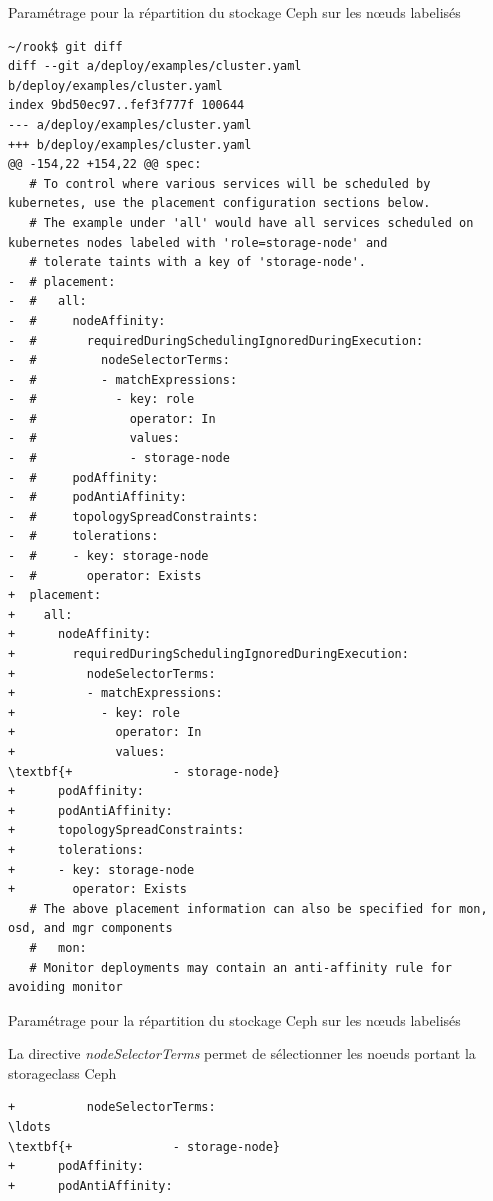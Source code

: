 \begin{frame}[shrink=5,fragile]{Paramétrage pour la répartition du stockage Ceph sur les n\oe{}uds labelisés}

\begin{tiny}
\begin{Verbatim}[commandchars=\\\{\}]
~/rook$ git diff
diff --git a/deploy/examples/cluster.yaml b/deploy/examples/cluster.yaml
index 9bd50ec97..fef3f777f 100644
--- a/deploy/examples/cluster.yaml
+++ b/deploy/examples/cluster.yaml
@@ -154,22 +154,22 @@ spec:
   # To control where various services will be scheduled by kubernetes, use the placement configuration sections below.
   # The example under 'all' would have all services scheduled on kubernetes nodes labeled with 'role=storage-node' and
   # tolerate taints with a key of 'storage-node'.
-  # placement:
-  #   all:
-  #     nodeAffinity:
-  #       requiredDuringSchedulingIgnoredDuringExecution:
-  #         nodeSelectorTerms:
-  #         - matchExpressions:
-  #           - key: role
-  #             operator: In
-  #             values:
-  #             - storage-node
-  #     podAffinity:
-  #     podAntiAffinity:
-  #     topologySpreadConstraints:
-  #     tolerations:
-  #     - key: storage-node
-  #       operator: Exists
+  placement:
+    all:
+      nodeAffinity:
+        requiredDuringSchedulingIgnoredDuringExecution:
+          nodeSelectorTerms:
+          - matchExpressions:
+            - key: role
+              operator: In
+              values:
\textbf{+              - storage-node}
+      podAffinity:
+      podAntiAffinity:
+      topologySpreadConstraints:
+      tolerations:
+      - key: storage-node
+        operator: Exists
   # The above placement information can also be specified for mon, osd, and mgr components
   #   mon:
   # Monitor deployments may contain an anti-affinity rule for avoiding monitor
\end{Verbatim}
\end{tiny}


\end{frame}


\begin{frame}[fragile]{Paramétrage pour la répartition du stockage Ceph sur les n\oe{}uds labelisés}

   La directive \textit{nodeSelectorTerms} permet de sélectionner les noeuds portant la storageclass Ceph

\begin{tiny}
\begin{Verbatim}[commandchars=\\\{\}]
+          nodeSelectorTerms:
\ldots
\textbf{+              - storage-node}
+      podAffinity:
+      podAntiAffinity:
\end{Verbatim}
\end{tiny}


\end{frame}

